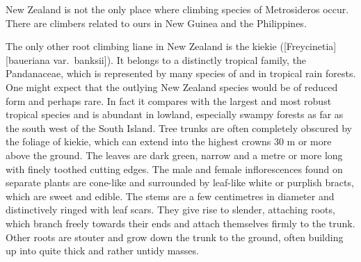 New Zealand is not the only place where climbing species of Metrosideros occur.
There are climbers related to ours in New Guinea and the Philippines.

The only other root climbing liane in New Zealand is the kiekie ([Freycinetia][baueriana var.\ banksii]).
It belongs to a distinctly tropical family, the Pandanaceae, which is represented by many species of  and  in tropical rain forests.
One might expect that the outlying New Zealand species would be of reduced form and perhaps rare.
In fact it compares with the largest and most robust tropical species and is abundant in lowland, especially swampy forests as far as the south west of the South Island.
Tree trunks are often completely obscured by the foliage of kiekie, which can extend into the highest crowns 30 m or more above the ground.
The leaves are dark green, narrow and a metre or more long with finely toothed cutting edges.
The male and female inflorescences found on separate plants are cone-like and surrounded by leaf-like white or purplish bracts, which are sweet and edible.
The stems are a few centimetres in diameter and distinctively ringed with leaf scars.
They give rise to slender, attaching roots, which branch freely towards their ends and attach themselves firmly to the trunk.
Other roots are stouter and grow down the trunk to the ground, often building up into quite thick and rather untidy masses.

